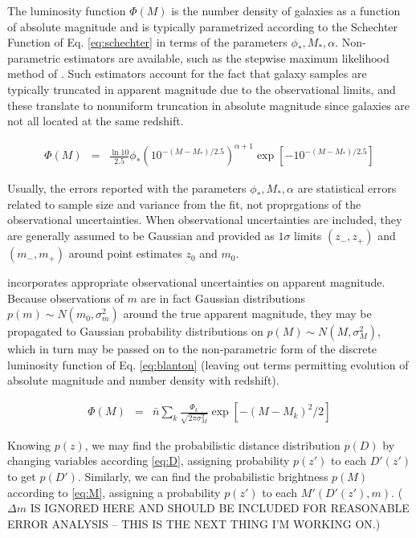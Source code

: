 \documentclass[12pt, onecolumn]{emulateapj}
\begin{document}
The luminosity function $\Phi(M)$ is the number density of galaxies as a function of absolute magnitude and is typically parametrized according to the Schechter Function of Eq. \ref{eq:schechter} in terms of the parameters $\phi_{*},M_{*},\alpha$.  Non-parametric estimators are available, such as the stepwise maximum likelihood method of \citet{efs88}.  Such estimators account for the fact that galaxy samples are typically truncated in apparent magnitude due to the observational limits, and these translate to nonuniform truncation in absolute magnitude since galaxies are not all located at the same redshift.  

\begin{eqnarray}
\label{eq:schechter}
\Phi(M) &=& \frac{\ln10}{2.5} \phi_{*}(10^{-(M-M_{*})/2.5})^{\alpha+1}\exp[-10^{-(M-M_{*})/2.5}]
\end{eqnarray}

Usually, the errors reported with the parameters $\phi_{*},M_{*},\alpha$ are statistical errors related to sample size and variance from the fit, not proprgations of the observational uncertainties.  When observational uncertainties are included, they are generally assumed to be Gaussian and provided as $1\sigma$ limits $(z_{-},z_{+})$ and $(m_{-},m_{+})$ around point estimates $z_{0}$ and $m_{0}$.  

\citet{bla02} incorporates appropriate observational uncertainties on apparent magnitude.  Because observations of $m$ are in fact Gaussian distributions $p(m)\sim N(m_{0},\sigma_{m}^{2})$ around the true apparent magnitude, they may be propagated to Gaussian probability distributions on $p(M)\sim N(M,\sigma_{M}^{2})$, which in turn may be passed on to the non-parametric form of the discrete luminosity function of Eq. \ref{eq:blanton} (leaving out terms permitting evolution of absolute magnitude and number density with redshift). 

\begin{eqnarray}
\label{eq:blanton}
\Phi(M) &=& \bar{n}\sum_{k}\frac{\Phi_{k}}{\sqrt{2\pi\sigma_{M}^{2}}}\exp[-(M-M_{k})^{2}/2]
\end{eqnarray}

Knowing $p(z)$, we may find the probabilistic distance distribution $p(D)$ by changing variables according \ref{eq:D}, assigning probability $p(z')$ to each $D'(z')$ to get $p(D')$.  Similarly, we can find the probabilistic brightness $p(M)$ according to \ref{eq:M}, assigning a probability $p(z')$ to each $M'(D'(z'),m)$.  ($\Delta m$ IS IGNORED HERE AND SHOULD BE INCLUDED FOR REASONABLE ERROR ANALYSIS -- THIS IS THE NEXT THING I'M WORKING ON.)
\end{document}
